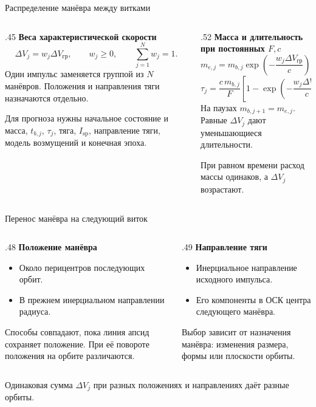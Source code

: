 \documentclass[11pt,aspectratio=169,t]{beamer}
\newcommand{\eqcompact}{\fontsize{10}{12}\selectfont}
\newcommand{\derivationmathspacing}{%
  \setlength{\abovedisplayskip}{2pt}%
  \setlength{\belowdisplayskip}{3pt}%
  \setlength{\abovedisplayshortskip}{2pt}%
  \setlength{\belowdisplayshortskip}{2pt}%
  \setlength{\jot}{2pt}}
\begin{document}
\begin{frame}{Распределение манёвра между витками}
\relax\derivationmathspacing
\begin{columns}[T,onlytextwidth]
\begin{column}{.45\textwidth}
\textbf{Веса характеристической скорости}
{\eqcompact\derivationmathspacing
\[
 \Delta V_j=w_j\Delta V_{\text{гр}},\qquad
 w_j\geqslant0,\qquad \sum_{j=1}^N w_j=1.
\]
}
Один импульс заменяется группой из $N$ манёвров.
Положения и направления тяги назначаются отдельно.
\par\smallskip
Для прогноза нужны начальное состояние и масса,
$t_{b,j}$, $\tau_j$, тяга, $I_{\mathrm{sp}}$, направление тяги,
модель возмущений и конечная эпоха.
\end{column}
\begin{column}{.52\textwidth}
\textbf{Масса и длительность при постоянных $F,c$}
{\eqcompact\derivationmathspacing
\[
 m_{e,j}=m_{b,j}\exp\!\left(-\frac{w_j\Delta V_{\text{гр}}}{c}\right),
\]
\[
 \tau_j=\frac{c\,m_{b,j}}{F}
 \left[1-\exp\!\left(-\frac{w_j\Delta V_{\text{гр}}}{c}\right)\right].
\]
}
На паузах $m_{b,j+1}=m_{e,j}$.
Равные $\Delta V_j$ дают уменьшающиеся длительности.
\par\smallskip
При равном времени расход массы одинаков, а $\Delta V_j$ возрастают.
\end{column}
\end{columns}
\end{frame}

\begin{frame}{Перенос манёвра на следующий виток}
\relax\derivationmathspacing
\begin{columns}[T,onlytextwidth]
\begin{column}{.48\textwidth}
\textbf{Положение манёвра}
\begin{itemize}
\setlength{\itemsep}{5pt}
\item Около перицентров последующих орбит.
\item В прежнем инерциальном направлении радиуса.
\end{itemize}
\smallskip
Способы совпадают, пока линия апсид сохраняет положение.
При её повороте положения на орбите различаются.
\end{column}
\begin{column}{.49\textwidth}
\textbf{Направление тяги}
\begin{itemize}
\setlength{\itemsep}{5pt}
\item Инерциальное направление исходного импульса.
\item Его компоненты в ОСК центра следующего манёвра.
\end{itemize}
\smallskip
Выбор зависит от назначения манёвра: изменения
размера, формы или плоскости орбиты.
\end{column}
\end{columns}
\par\medskip
Одинаковая сумма $\Delta V_j$ при разных положениях
и направлениях даёт разные орбиты.
\end{frame}
\end{document}
